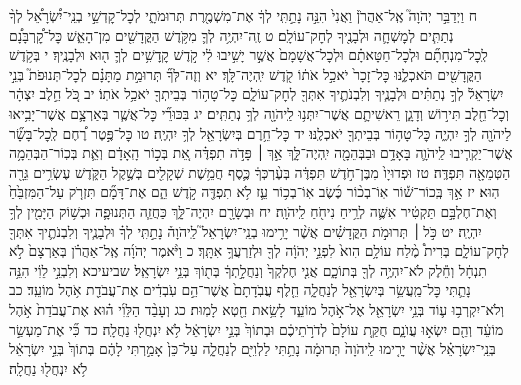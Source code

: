 \documentclass[twoside, openany, parskip=half, 11pt]{book}
\begin{document}
ח וַיְדַבֵּ֣ר יְהֹוָה֮ אֶֽל־אַהֲרֹן֒ וַאֲנִי֙ הִנֵּ֣ה נָתַ֣תִּֽי לְךָ֔ אֶת־מִשְׁמֶ֖רֶת תְּרוּמֹתָ֑י לְכׇל־קׇדְשֵׁ֣י בְנֵֽי־יִ֠שְׂרָאֵ֠ל לְךָ֨ נְתַתִּ֧ים לְמׇשְׁחָ֛ה וּלְבָנֶ֖יךָ לְחׇק־עוֹלָֽם׃ ט זֶֽה־יִהְיֶ֥ה לְךָ֛ מִקֹּ֥דֶשׁ הַקֳּדָשִׁ֖ים מִן־הָאֵ֑שׁ כׇּל־קׇ֠רְבָּנָ֠ם לְֽכׇל־מִנְחָתָ֞ם וּלְכׇל־חַטָּאתָ֗ם וּלְכׇל־אֲשָׁמָם֙ אֲשֶׁ֣ר יָשִׁ֣יבוּ לִ֔י קֹ֣דֶשׁ קׇֽדָשִׁ֥ים לְךָ֛ ה֖וּא וּלְבָנֶֽיךָ׃ י בְּקֹ֥דֶשׁ הַקֳּדָשִׁ֖ים תֹּאכְלֶ֑נּוּ כׇּל־זָכָר֙ יֹאכַ֣ל אֹת֔וֹ קֹ֖דֶשׁ יִֽהְיֶה־לָּֽךְ׃ יא וְזֶה־לְּךָ֞ תְּרוּמַ֣ת מַתָּנָ֗ם לְכׇל־תְּנוּפֹת֮ בְּנֵ֣י יִשְׂרָאֵל֒ לְךָ֣ נְתַתִּ֗ים וּלְבָנֶ֧יךָ וְלִבְנֹתֶ֛יךָ אִתְּךָ֖ לְחׇק־עוֹלָ֑ם כׇּל־טָה֥וֹר בְּבֵיתְךָ֖ יֹאכַ֥ל אֹתֽוֹ׃ יב כֹּ֚ל חֵ֣לֶב יִצְהָ֔ר וְכׇל־חֵ֖לֶב תִּיר֣וֹשׁ וְדָגָ֑ן רֵאשִׁיתָ֛ם אֲשֶׁר־יִתְּנ֥וּ לַֽיהֹוָ֖ה לְךָ֥ נְתַתִּֽים׃ יג בִּכּוּרֵ֞י כׇּל־אֲשֶׁ֧ר בְּאַרְצָ֛ם אֲשֶׁר־יָבִ֥יאוּ לַיהֹוָ֖ה לְךָ֣ יִהְיֶ֑ה כׇּל־טָה֥וֹר בְּבֵיתְךָ֖ יֹאכְלֶֽנּוּ׃ יד כׇּל־חֵ֥רֶם בְּיִשְׂרָאֵ֖ל לְךָ֥ יִהְיֶֽה׃ טו כׇּל־פֶּ֣טֶר רֶ֠חֶם לְֽכׇל־בָּשָׂ֞ר אֲשֶׁר־יַקְרִ֧יבוּ לַֽיהֹוָ֛ה בָּאָדָ֥ם וּבַבְּהֵמָ֖ה יִֽהְיֶה־לָּ֑ךְ אַ֣ךְ ׀ פָּדֹ֣ה תִפְדֶּ֗ה אֵ֚ת בְּכ֣וֹר הָֽאָדָ֔ם וְאֵ֛ת בְּכֽוֹר־הַבְּהֵמָ֥ה הַטְּמֵאָ֖ה תִּפְדֶּֽה׃ טז וּפְדוּיָו֙ מִבֶּן־חֹ֣דֶשׁ תִּפְדֶּ֔ה בְּעֶ֨רְכְּךָ֔ כֶּ֛סֶף חֲמֵ֥שֶׁת שְׁקָלִ֖ים בְּשֶׁ֣קֶל הַקֹּ֑דֶשׁ עֶשְׂרִ֥ים גֵּרָ֖ה הֽוּא׃ יז אַ֣ךְ בְּֽכוֹר־שׁ֡וֹר אֽוֹ־בְכ֨וֹר כֶּ֜שֶׂב אֽוֹ־בְכ֥וֹר עֵ֛ז לֹ֥א תִפְדֶּ֖ה קֹ֣דֶשׁ הֵ֑ם אֶת־דָּמָ֞ם תִּזְרֹ֤ק עַל־הַמִּזְבֵּ֙חַ֙ וְאֶת־חֶלְבָּ֣ם תַּקְטִ֔יר אִשֶּׁ֛ה לְרֵ֥יחַ נִיחֹ֖חַ לַֽיהֹוָֽה׃ יח וּבְשָׂרָ֖ם יִהְיֶה־לָּ֑ךְ כַּחֲזֵ֧ה הַתְּנוּפָ֛ה וּכְשׁ֥וֹק הַיָּמִ֖ין לְךָ֥ יִהְיֶֽה׃ יט כֹּ֣ל ׀ תְּרוּמֹ֣ת הַקֳּדָשִׁ֗ים אֲשֶׁ֨ר יָרִ֥ימוּ בְנֵֽי־יִשְׂרָאֵל֮ לַֽיהֹוָה֒ נָתַ֣תִּֽי לְךָ֗ וּלְבָנֶ֧יךָ וְלִבְנֹתֶ֛יךָ אִתְּךָ֖ לְחׇק־עוֹלָ֑ם בְּרִית֩ מֶ֨לַח עוֹלָ֥ם הִוא֙ לִפְנֵ֣י יְהֹוָ֔ה לְךָ֖ וּלְזַרְעֲךָ֥ אִתָּֽךְ׃ כ וַיֹּ֨אמֶר יְהֹוָ֜ה אֶֽל־אַהֲרֹ֗ן בְּאַרְצָם֙ לֹ֣א תִנְחָ֔ל וְחֵ֕לֶק לֹא־יִהְיֶ֥ה לְךָ֖ בְּתוֹכָ֑ם אֲנִ֤י חֶלְקְךָ֙ וְנַחֲלָ֣תְךָ֔ בְּת֖וֹךְ בְּנֵ֥י יִשְׂרָאֵֽל׃
שביעיכא וְלִבְנֵ֣י לֵוִ֔י הִנֵּ֥ה נָתַ֛תִּי כׇּל־מַֽעֲשֵׂ֥ר בְּיִשְׂרָאֵ֖ל לְנַחֲלָ֑ה חֵ֤לֶף עֲבֹֽדָתָם֙ אֲשֶׁר־הֵ֣ם עֹֽבְדִ֔ים אֶת־עֲבֹדַ֖ת אֹ֥הֶל מוֹעֵֽד׃ כב וְלֹא־יִקְרְב֥וּ ע֛וֹד בְּנֵ֥י יִשְׂרָאֵ֖ל אֶל־אֹ֣הֶל מוֹעֵ֑ד לָשֵׂ֥את חֵ֖טְא לָמֽוּת׃ כג וְעָבַ֨ד הַלֵּוִ֜י ה֗וּא אֶת־עֲבֹדַת֙ אֹ֣הֶל מוֹעֵ֔ד וְהֵ֖ם יִשְׂא֣וּ עֲוֺנָ֑ם חֻקַּ֤ת עוֹלָם֙ לְדֹרֹ֣תֵיכֶ֔ם וּבְתוֹךְ֙ בְּנֵ֣י יִשְׂרָאֵ֔ל לֹ֥א יִנְחֲל֖וּ נַחֲלָֽה׃ כד כִּ֞י אֶת־מַעְשַׂ֣ר בְּנֵֽי־יִשְׂרָאֵ֗ל אֲשֶׁ֨ר יָרִ֤ימוּ לַֽיהֹוָה֙ תְּרוּמָ֔ה נָתַ֥תִּי לַלְוִיִּ֖ם לְנַחֲלָ֑ה עַל־כֵּן֙ אָמַ֣רְתִּי לָהֶ֔ם בְּתוֹךְ֙ בְּנֵ֣י יִשְׂרָאֵ֔ל לֹ֥א יִנְחֲל֖וּ נַחֲלָֽה׃
\end{document}
